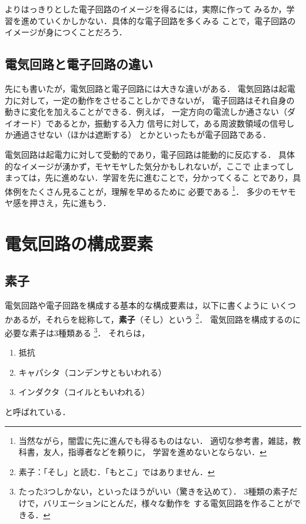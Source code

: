         よりはっきりとした電子回路のイメージを得るには，実際に作って
        みるか，学習を進めていくかしかない．具体的な電子回路を多くみる
        ことで，電子回路のイメージが身につくことだろう．

    \subsection{電気回路と電子回路の違い}
        先にも書いたが，電気回路と電子回路には大きな違いがある．
        電気回路は起電力に対して，一定の動作をさせることしかできないが，
        電子回路はそれ自身の動きに変化を加えることができる．例えば，
        一定方向の電流しか通さない（ダイオード）であるとか，振動する入力
        信号に対して，ある周波数領域の信号しか通過させない（ほかは遮断する）
        とかといったもが電子回路である．

        電気回路は起電力に対して受動的であり，電子回路は能動的に反応する．
        具体的なイメージが湧かず，モヤモヤした気分かもしれないが，ここで
        止まってしまっては，先に進めない．学習を先に進むことで，分かってくるこ
        とであり，具体例をたくさん見ることが，理解を早めるために
        必要である
            \footnote{
                当然ながら，闇雲に先に進んでも得るものはない．
                適切な参考書，雑誌，教科書，友人，指導者などを頼りに，
                学習を進めないとならない．
            }．
        多少のモヤモヤ感を押さえ，先に進もう．

    \section{電気回路の構成要素}
    \subsection{素子}
        電気回路や電子回路を構成する基本的な構成要素は，以下に書くように
        いくつかあるが，それらを総称して，\textbf{素子}（そし）という
            \footnote{
                素子：「そし」と読む．「もとこ」ではありません．
            }．
        電気回路を構成するのに必要な素子は3種類ある
            \footnote{
                たった3つしかない，といったほうがいい（驚きを込めて）．
                3種類の素子だけで，バリエーションにとんだ，様々な動作を
                する電気回路を作ることができる．
            }．
        それらは，
            \begin{enumerate}
                \item 抵抗
                \item キャパシタ（コンデンサともいわれる）
                \item インダクタ（コイルともいわれる）
            \end{enumerate}
        と呼ばれている．

